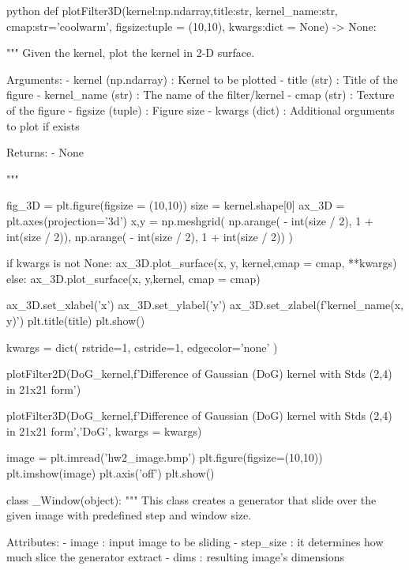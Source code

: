 \documentclass[12pt]{amsart}
\begin{document}
\begin{mintedbox}{python}
def plotFilter3D(kernel:np.ndarray,title:str,
                 kernel_name:str, 
                 cmap:str='coolwarm',
                 figsize:tuple = (10,10),
                 kwargs:dict = None) -> None:

    """
        Given the kernel, plot the kernel in 2-D surface.

            Arguments:
                - kernel (np.ndarray) : Kernel to be plotted
                - title  (str)        : Title of the figure
                - kernel_name (str)   : The name of the filter/kernel
                - cmap   (str)        : Texture of the figure
                - figsize (tuple)     : Figure size
                - kwargs (dict)       : Additional orguments to plot if exists

            Returns:
                - None



    """

    fig_3D = plt.figure(figsize = (10,10))
    size = kernel.shape[0]
    ax_3D = plt.axes(projection='3d')
    x,y = np.meshgrid(
        np.arange( - int(size / 2), 1 + int(size / 2)),
        np.arange( - int(size / 2), 1 + int(size / 2))
                )
    
    
    if kwargs is not None:
        ax_3D.plot_surface(x, y, kernel,cmap = cmap, **kwargs)
    else:
        ax_3D.plot_surface(x, y,kernel, cmap = cmap)   
    
    ax_3D.set_xlabel('x')
    ax_3D.set_ylabel('y')
    ax_3D.set_zlabel(f'{kernel_name}(x, y)')
    plt.title(title)
    plt.show()

kwargs = dict(
    rstride=1,
    cstride=1,     
    edgecolor='none'
)


plotFilter2D(DoG_kernel,f'Difference of Gaussian (DoG) kernel with Stds {(2,4)} in 21x21 form')

plotFilter3D(DoG_kernel,f'Difference of Gaussian (DoG) kernel with Stds {(2,4)} in 21x21 form','DoG', kwargs = kwargs)

image = plt.imread('hw2_image.bmp')
plt.figure(figsize=(10,10))
plt.imshow(image)
plt.axis('off')
plt.show()

class _Window(object):
  """
    This class creates a generator that slide over the given image with
    predefined step and window size.

      Attributes:
        - image      : input image to be sliding
        - step_size  : it determines how much slice the generator extract
        - dims       : resulting image's dimensions


\end{mintedbox}
\end{document}
